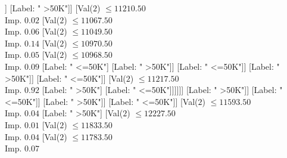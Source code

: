 \documentclass[margin=10pt]{standalone}
\begin{document}
\begin{forest}
																									[Val($2$) $ \leq 11249.50$ \\ Imp. $0.04$
																										[Val($2$) $ \leq 11243.50$ \\ Imp. $0.05$
																											[Val($2$) $ \leq 10681.50$ \\ Imp. $0.02$
																												[Label: " <=50K"]
																												[Val($2$) $ \leq 10746.50$ \\ Imp. $0.03$
																													[Label: " <=50K"]
																													[Val($2$) $ \leq 10777.50$ \\ Imp. $0.06$
																														[Val($2$) $ \leq 10767.50$ \\ Imp. $0.31$
																															[Val($2$) $ \leq 10762.50$ \\ Imp. $0.25$
																																[Label: " >50K"]
																																[Label: " <=50K"]]
																															[Label: " >50K"]]
																														[Val($2$) $ \leq 11210.50$ \\ Imp. $0.02$
																															[Val($2$) $ \leq 11067.50$ \\ Imp. $0.06$
																																[Val($2$) $ \leq 11049.50$ \\ Imp. $0.14$
																																	[Val($2$) $ \leq 10970.50$ \\ Imp. $0.05$
																																		[Val($2$) $ \leq 10968.50$ \\ Imp. $0.09$
																																			[Label: " <=50K"]
																																			[Label: " >50K"]]
																																		[Label: " <=50K"]]
																																	[Label: " >50K"]]
																																[Label: " <=50K"]]
																															[Val($2$) $ \leq 11217.50$ \\ Imp. $0.92$
																																[Label: " >50K"]
																																[Label: " <=50K"]]]]]]
																											[Label: " >50K"]]
																										[Label: " <=50K"]]
																									[Label: " >50K"]]
																								[Label: " <=50K"]]
																							[Val($2$) $ \leq 11593.50$ \\ Imp. $0.04$
																								[Label: " >50K"]
																								[Val($2$) $ \leq 12227.50$ \\ Imp. $0.01$
																									[Val($2$) $ \leq 11833.50$ \\ Imp. $0.04$
																										[Val($2$) $ \leq 11783.50$ \\ Imp. $0.07$

\end{forest}
\end{document}

